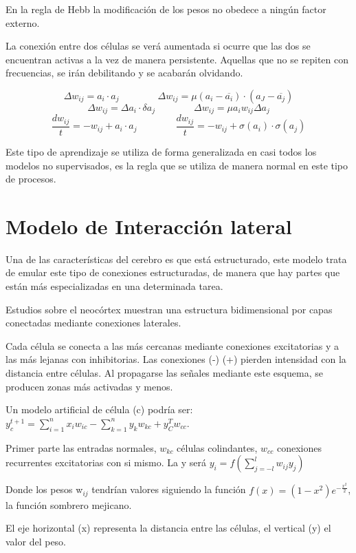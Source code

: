 \documentclass[12pt, twoside, openright]{report} %
\begin{document}
En la regla de Hebb la modificación de los pesos no obedece a ningún factor externo.

La conexión entre dos células se verá aumentada si ocurre que las dos se encuentran activas a la vez de manera persistente. Aquellas que no se repiten con frecuencias, se irán debilitando y se acabarán olvidando.

$$\Delta w_{ij}=a_i\cdot a_j \quad\quad\quad\quad \Delta w_{ij}=\mu(a_i - \overline{a_i})\cdot(a_J- \overline{a_j})$$
$$\Delta w_{ij}=\Delta a_i\cdot \delta a_j \quad\quad\quad\quad \Delta w_{ij}= \mu a_i w_{ij} \Delta a_j$$
$$\frac{dw_{ij}}{t}=-w_{ij}+a_i\cdot a_j \quad\quad\quad\quad \frac{dw_{ij}}{t}=-w_{ij} + \sigma(a_i) \cdot \sigma(a_j)$$

Este tipo de aprendizaje se utiliza de forma generalizada en casi todos los modelos no supervisados, es la regla que se utiliza de manera normal en este tipo de procesos.

\section{Modelo de Interacción lateral}
Una de las características del cerebro es que está estructurado, este modelo trata de emular este tipo de conexiones estructuradas, de manera que hay partes que están más especializadas en una determinada tarea.

Estudios sobre el neocórtex muestran una estructura bidimensional por capas conectadas mediante conexiones laterales.

Cada célula se conecta a las más cercanas mediante conexiones excitatorias y a las más lejanas con inhibitorias. Las conexiones (-) (+) pierden intensidad con la distancia entre células. Al propagarse las señales mediante este esquema, se producen zonas más activadas y menos.

Un modelo artificial de célula (c) podría ser: $y_c^{t+1}=\sum^n_{i=1} x_i w_{ic} - \sum^n_{k=1} y_k w_{kc}+y^T_C w_{cc}$.


Primer parte las entradas normales, $w_{kc}$ células colindantes, $w_{cc}$ conexiones recurrentes excitatorias con si mismo. La y será $y_i = f \left(\sum^l_{j=-l} w_{ij}y_j\right)$

Donde los pesos w$_{ij}$ tendrían valores siguiendo la función $f(x) = (1 - x^2)e^{- \frac{x^2}{2}}$, la función sombrero mejicano.

El eje horizontal (x) representa la distancia entre las células, el vertical (y) el valor del peso.
\end{document}
